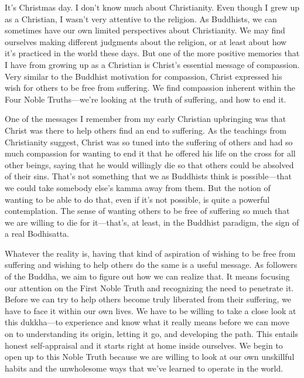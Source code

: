 
It's Christmas day. I don't know much about Christianity. Even though I 
grew up as a Christian, I wasn't very attentive to the religion. As 
Buddhists, we can sometimes have our own limited perspectives about 
Christianity. We may find ourselves making different judgments about 
the religion, or at least about how it's practiced in the world these 
days. But one of the more positive memories that I have from growing up 
as a Christian is Christ's essential message of compassion. Very 
similar to the Buddhist motivation for compassion, Christ expressed his 
wish for others to be free from suffering. We find compassion inherent 
within the Four Noble Truths---we're looking at the truth of suffering, 
and how to end it.

One of the messages I remember from my early Christian upbringing was 
that Christ was there to help others find an end to suffering. As the 
teachings from Christianity suggest, Christ was so tuned into the 
suffering of others and had so much compassion for wanting to end it 
that he offered his life on the cross for all other beings, saying that 
he would willingly die so that others could be absolved of their sins. 
That's not something that we as Buddhists think is possible---that we 
could take somebody else's kamma away from them. But the notion of 
wanting to be able to do that, even if it's not possible, is quite a 
powerful contemplation. The sense of wanting others to be free of 
suffering so much that we are willing to die for it---that's, at least, 
in the Buddhist paradigm, the sign of a real Bodhisatta.

Whatever the reality is, having that kind of aspiration of wishing to 
be free from suffering and wishing to help others do the same is a 
useful message. As followers of the Buddha, we aim to figure out how we 
can realize that. It means focusing our attention on the First Noble 
Truth and recognizing the need to penetrate it. Before we can try to 
help others become truly liberated from their suffering, we have to 
face it within our own lives. We have to be willing to take a close 
look at this dukkha---to experience and know what it really means 
before we can move on to understanding its origin, letting it go, and 
developing the path. This entails honest self-appraisal and it starts 
right at home inside ourselves. We begin to open up to this Noble Truth 
because we are willing to look at our own unskillful habits and the 
unwholesome ways that we've learned to operate in the world.

